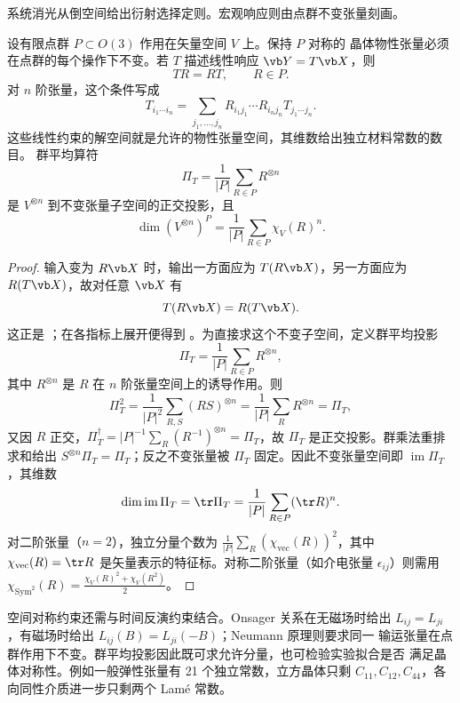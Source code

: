 系统消光从倒空间给出衍射选择定则。宏观响应则由点群不变张量刻画。

\begin{proposition}
设有限点群 $P\subset O(3)$ 作用在矢量空间 $V$ 上。保持 $P$ 对称的
晶体物性张量必须在点群的每个操作下不变。若 $T$ 描述线性响应
$\vb Y=T\vb X$，则
\begin{equation}
TR=RT,
\qquad R\in P.
\label{thm:neumann}
\end{equation}
对 $n$ 阶张量，这个条件写成
\begin{equation}
T_{i_1\cdots i_n}
=\sum_{j_1,\dots,j_n}R_{i_1j_1}\cdots R_{i_nj_n}T_{j_1\cdots j_n}.
\label{eq:neumann-tensor-invariance}
\end{equation}
这些线性约束的解空间就是允许的物性张量空间，其维数给出独立材料常数的数目。
群平均算符
\[
\Pi_T=\frac1{|P|}\sum_{R\in P}R^{\otimes n}
\]
是 $V^{\otimes n}$ 到不变张量子空间的正交投影，且
\[
\dim(V^{\otimes n})^P=\frac1{|P|}\sum_{R\in P}\chi_V(R)^n.
\]
\end{proposition}

\begin{proof}
输入变为 $R\vb X$ 时，输出一方面应为 $T(R\vb X)$，另一方面应为
$R(T\vb X)$，故对任意 $\vb X$ 有
\[
T(R\vb X)=R(T\vb X).
\]
这正是 ；在各指标上展开便得到
。为直接求这个不变子空间，定义群平均投影
\[
\Pi_T=\frac1{|P|}\sum_{R\in P}R^{\otimes n},
\]
其中 $R^{\otimes n}$ 是 $R$ 在 $n$ 阶张量空间上的诱导作用。则
\[
\Pi_T^2=\frac1{|P|^2}\sum_{R,S}(RS)^{\otimes n}=\frac1{|P|}\sum_{R}R^{\otimes n}=\Pi_T,
\]
又因 $R$ 正交，$\Pi_T^\dagger=|P|^{-1}\sum_R(R^{-1})^{\otimes n}=\Pi_T$，故 $\Pi_T$ 是正交投影。群乘法重排求和给出 $S^{\otimes n}\Pi_T=\Pi_T$；反之不变张量被 $\Pi_T$ 固定。因此不变张量空间即 $\operatorname{im}\Pi_T$，其维数
\[
\dim\operatorname{im}\Pi_T=\tr\Pi_T=\frac1{|P|}\sum_{R\in P}(\tr R)^n.
\]
对二阶张量（$n=2$），独立分量个数为 $\frac1{|P|}\sum_{R}(\chi_\text{vec}(R))^2$，其中 $\chi_\text{vec}(R)=\tr R$ 是矢量表示的特征标。对称二阶张量（如介电张量 $\epsilon_{ij}$）则需用 $\chi_{\mathrm{Sym}^2}(R)=\frac{\chi_V(R)^2+\chi_V(R^2)}{2}$。
\end{proof}

\par\medskip
\par\medskip

空间对称约束还需与时间反演约束结合。Onsager 关系在无磁场时给出
$L_{ij}=L_{ji}$，有磁场时给出 $L_{ij}(B)=L_{ji}(-B)$；Neumann 原理则要求同一
输运张量在点群作用下不变。群平均投影因此既可求允许分量，也可检验实验拟合是否
满足晶体对称性。例如一般弹性张量有 21 个独立常数，立方晶体只剩
$C_{11},C_{12},C_{44}$，各向同性介质进一步只剩两个 Lam\'e 常数。

